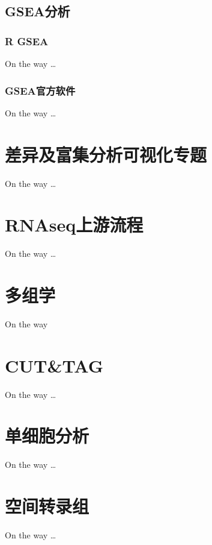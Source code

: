 \documentclass[
]{book}
\begin{document}
\hypertarget{enrich-gsea}{%
\section{GSEA分析}\label{enrich-gsea}}

\hypertarget{r-gsea}{%
\subsection{R GSEA}\label{r-gsea}}

On the way \ldots{}

\hypertarget{gseaux5b98ux65b9ux8f6fux4ef6}{%
\subsection{GSEA官方软件}\label{gseaux5b98ux65b9ux8f6fux4ef6}}

On the way \ldots{}

\hypertarget{visual}{%
\chapter{差异及富集分析可视化专题}\label{visual}}

On the way \ldots{}

\hypertarget{rnaseq-rsubread}{%
\chapter{RNAseq上游流程}\label{rnaseq-rsubread}}

On the way \ldots{}

\hypertarget{multi-omics}{%
\chapter{多组学}\label{multi-omics}}

On the way

\hypertarget{cuttag}{%
\chapter{CUT\&TAG}\label{cuttag}}

On the way \ldots{}

\hypertarget{scRNA}{%
\chapter{单细胞分析}\label{scRNA}}

On the way \ldots{}

\hypertarget{spatial}{%
\chapter{空间转录组}\label{spatial}}

On the way \ldots{}

  
\end{document}
